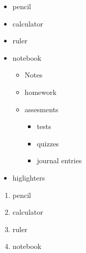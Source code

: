 \documentclass[11pt]{article}
\begin{document}
\begin{itemize}
    \item pencil
    \item calculator
    \item ruler
    \item notebook
          \begin{itemize}
              \item Notes
              \item homework
              \item assesments
                    \begin{itemize}
                        \item tests
                        \item quizzes
                        \item journal entries
                    \end{itemize}
          \end{itemize}
    \item higlighters
\end{itemize}
\vspace{1cm}

\begin{enumerate}
    \item[] pencil
    \item[] calculator
    \item[] ruler
    \item[] notebook
\end{enumerate}

\end{document}
